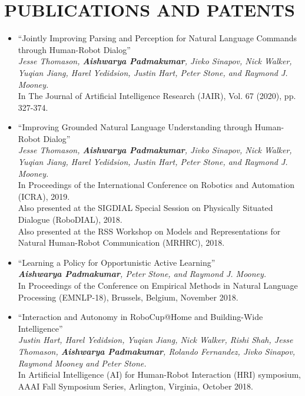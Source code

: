 \documentclass[letterpaper,10pt]{resume}
\begin{document}
{\section{PUBLICATIONS AND PATENTS}
\begin{itemize}
\item  ``Jointly Improving Parsing and Perception for Natural Language Commands through Human-Robot Dialog'' \\
\textit{Jesse Thomason, \textbf{Aishwarya Padmakumar}, Jivko Sinapov, Nick Walker, Yuqian Jiang, Harel Yedidsion, Justin Hart, Peter Stone, and Raymond J. Mooney.} \\
In The Journal of Artificial Intelligence Research (JAIR), Vol. 67 (2020), pp. 327-374.
\vspace{0.2cm}

\item  ``Improving Grounded Natural Language Understanding through Human-Robot Dialog'' \\
\textit{Jesse Thomason, \textbf{Aishwarya Padmakumar}, Jivko Sinapov, Nick Walker, Yuqian Jiang, Harel Yedidsion, Justin Hart, Peter Stone, and Raymond J. Mooney.} \\
In Proceedings of the International Conference on Robotics and Automation (ICRA), 2019. \\
Also presented at the SIGDIAL Special Session on Physically Situated Dialogue (RoboDIAL), 2018. \\
Also presented at the RSS Workshop on Models and Representations for Natural Human-Robot Communication (MRHRC), 2018. 
\vspace{0.2cm}

\item  ``Learning a Policy for Opportunistic Active Learning'' \\
\textit{\textbf{Aishwarya Padmakumar}, Peter Stone, and Raymond J. Mooney. } \\
In Proceedings of the Conference on Empirical Methods in Natural Language Processing (EMNLP-18), Brussels, Belgium, November 2018. 
\vspace{0.2cm}

\item  ``Interaction and Autonomy in RoboCup@Home and Building-Wide Intelligence'' \\
\textit{Justin Hart, Harel Yedidsion, Yuqian Jiang, Nick Walker, Rishi Shah, Jesse Thomason, \textbf{Aishwarya Padmakumar}, Rolando Fernandez, Jivko Sinapov, Raymond Mooney and Peter Stone. } \\
In Artificial Intelligence (AI) for Human-Robot Interaction (HRI) symposium, AAAI Fall Symposium Series, Arlington, Virginia, October 2018. 
\vspace{0.2cm}


\end{itemize}}
\end{document}
